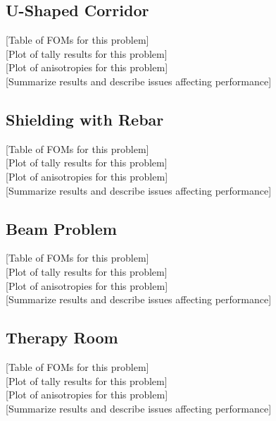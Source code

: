\subsection{U-Shaped Corridor}
\label{subsec:resultsucorridor}
[Table of FOMs for this problem] \\

[Plot of tally results for this problem] \\

[Plot of anisotropies for this problem] \\

[Summarize results and describe issues affecting performance] \\

\subsection{Shielding with Rebar}
\label{subsec:resultrebar}
[Table of FOMs for this problem] \\

[Plot of tally results for this problem] \\

[Plot of anisotropies for this problem] \\

[Summarize results and describe issues affecting performance] \\

\subsection{Beam Problem}
\label{subsec:resultsbeam}
[Table of FOMs for this problem] \\

[Plot of tally results for this problem] \\

[Plot of anisotropies for this problem] \\

[Summarize results and describe issues affecting performance] \\

\subsection{Therapy Room}
\label{subsec:resultstherapy}
[Table of FOMs for this problem] \\

[Plot of tally results for this problem] \\

[Plot of anisotropies for this problem] \\

[Summarize results and describe issues affecting performance] \\

